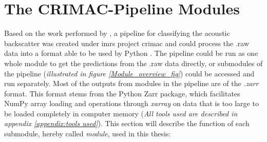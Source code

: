         
        
        
        \section{The CRIMAC-Pipeline Modules}\label{CRIMAC-pipeline}
        Based on the work performed by \citeauthor{brautaset2020acoustic} \cite{brautaset2020acoustic}, a pipeline for classifying the acoustic backscatter was created under \gls{imr}s project \gls{crimac} and could process the .raw data into a format able to be used by Python \cite{crimac_pipeline}. The pipeline could be run as one whole module to get the predictions from the .raw data directly, or submodules of the pipeline (\textit{illustrated in figure \ref{Module_overview_fig}}) could be accessed and run separately. Most of the outputs from modules in the pipeline are of the \textit{.zarr} format. This format stems from the Python Zarr package, which facilitates NumPy array loading and operations through \textit{xarray} on data that is too large to be loaded completely in computer memory (\textit{All tools used are described in appendix \ref{appendix:tools used}}). This section will describe the function of each submodule, hereby called \textit{module}, used in this thesis:
   

        
